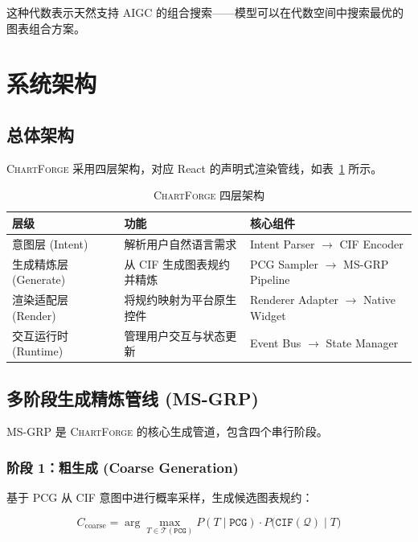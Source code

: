\documentclass[12pt,a4paper]{ctexart}
\theoremstyle{remark}
\newcommand{\ChartForge}{\textsc{ChartForge}}
\newcommand{\CIF}{\texttt{CIF}}
\newcommand{\PCG}{\texttt{PCG}}
\begin{document}
这种代数表示天然支持 AIGC 的组合搜索——模型可以在代数空间中搜索最优的图表组合方案。

\section{系统架构}\label{sec:architecture}

\subsection{总体架构}

\ChartForge{} 采用四层架构，对应 React 的声明式渲染管线，如表~\ref{tab:architecture} 所示。

\begin{table}[H]
\centering
\caption{\ChartForge{} 四层架构}
\label{tab:architecture}
\begin{tabularx}{\textwidth}{l|l|X}
\toprule
\textbf{层级} & \textbf{功能} & \textbf{核心组件} \\
\midrule
意图层 (Intent)      & 解析用户自然语言需求        & Intent Parser $\to$ CIF Encoder \\
生成精炼层 (Generate) & 从 CIF 生成图表规约并精炼   & PCG Sampler $\to$ MS-GRP Pipeline \\
渲染适配层 (Render)   & 将规约映射为平台原生控件     & Renderer Adapter $\to$ Native Widget \\
交互运行时 (Runtime)  & 管理用户交互与状态更新      & Event Bus $\to$ State Manager \\
\bottomrule
\end{tabularx}
\end{table}

\subsection{多阶段生成精炼管线 (MS-GRP)}\label{sec:msgrp}

MS-GRP 是 \ChartForge{} 的核心生成管道，包含四个串行阶段。

\subsubsection{阶段 1：粗生成 (Coarse Generation)}

基于 PCG 从 CIF 意图中进行概率采样，生成候选图表规约：

\begin{equation}
    C_{\text{coarse}} = \arg\max_{T \in \mathcal{T}(\PCG)}
    P(T \mid \PCG) \cdot P\big(\CIF(\mathcal{Q}) \mid T\big)
\end{equation}
\end{document}
